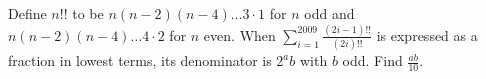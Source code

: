 Define $ n!!$ to be $ n(n-2)(n-4)\ldots3\cdot1$ for $ n$ odd and $ n(n-2)(n-4)\ldots4\cdot2$ for $ n$ even. When $ \displaystyle \sum_{i=1}^{2009} \frac{(2i-1)!!}{(2i)!!}$ is expressed as a fraction in lowest terms, its denominator is $ 2^ab$ with $ b$ odd. Find $ \displaystyle \frac{ab}{10}$.